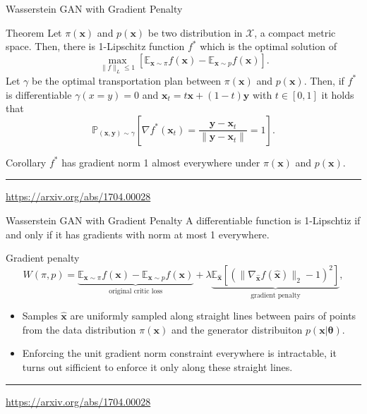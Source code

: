\documentclass{beamer}
\newcommand{\bx}{\mathbf{x}}
\newcommand{\by}{\mathbf{y}}
\newcommand{\bbE}{\mathbb{E}}
\newcommand{\bbP}{\mathbb{P}}
\newcommand{\cX}{\mathcal{X}}
\newcommand{\btheta}{\boldsymbol{\theta}}
\begin{document}
\begin{frame}{Wasserstein GAN with Gradient Penalty}
	\begin{block}{Theorem}
		Let $\pi(\bx)$ and $p(\bx)$ be two distribution in $\cX$, a compact metric space. Then, there is 1-Lipschitz function $f^*$ which is the optimal solution of 
		\[
			\max_{\| f \|_L \leq 1} \left[ \bbE_{\bx \sim \pi} f(\bx)  - \bbE_{\bx \sim p} f(\bx)\right].
		\]
		Let $\gamma$ be the optimal transportation plan between $\pi(\bx)$ and $p(\bx)$. Then, if $f^*$ is differentiable $\gamma(x = y) = 0$ and $\bx_t = t \bx + (1 - t) \by$ with $t \in [0, 1]$ it holds that
		\[
			\bbP_{(\bx, \by) \sim \gamma} \left[ \nabla f^*(\bx_t) = \frac{\by - \bx_t}{\| \by - \bx_t \|} = 1 \right].
		\]
	\end{block}
	\begin{block}{Corollary}
		$f^*$ has gradient norm 1 almost everywhere under $\pi(\bx)$ and $p(\bx)$.
	\end{block}
	\vfill
	\hrule\medskip 
	{\scriptsize \href{https://arxiv.org/abs/1704.00028}{https://arxiv.org/abs/1704.00028}}
\end{frame}
\begin{frame}{Wasserstein GAN with Gradient Penalty}
	A differentiable function is 1-Lipschtiz if and only if it has gradients with norm at most 1 everywhere.
	\begin{block}{Gradient penalty}
		\[
			W(\pi, p) = \underbrace{\bbE_{\bx \sim \pi} f(\bx)  - \bbE_{\bx \sim p} f(\bx)}_{\text{original critic loss}} + \lambda \underbrace{\bbE_{\hat{\bx}} \left[ \left( \| \nabla_{\hat{\bx}} f(\hat{\bx}) \|_2 - 1 \right) ^ 2\right]}_{\text{gradient penalty}},
		\]
	\end{block}
	\begin{itemize}
		\item Samples $\hat{\bx}$ are uniformly sampled along straight lines between pairs of points from the data distribution $\pi(\bx)$ and the generator distribuiton $p(\bx | \btheta)$.
		\item Enforcing the unit gradient norm constraint everywhere is intractable, it turns out sifficient to enforce it only along these straight lines.
	\end{itemize}
	\vfill
	\hrule\medskip 
	{\scriptsize \href{https://arxiv.org/abs/1704.00028}{https://arxiv.org/abs/1704.00028}}
\end{frame}
\end{document}
